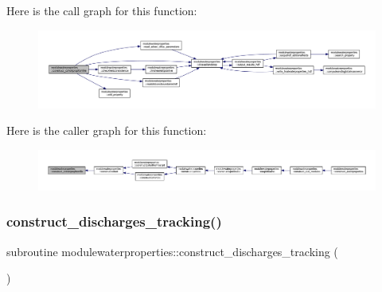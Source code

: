 Here is the call graph for this function\+:\nopagebreak
\begin{figure}[H]
\begin{center}
\leavevmode
\includegraphics[width=350pt]{namespacemodulewaterproperties_ad9060a1bd0766835e26c1961f52d84a0_cgraph}
\end{center}
\end{figure}
Here is the caller graph for this function\+:\nopagebreak
\begin{figure}[H]
\begin{center}
\leavevmode
\includegraphics[width=350pt]{namespacemodulewaterproperties_ad9060a1bd0766835e26c1961f52d84a0_icgraph}
\end{center}
\end{figure}
\mbox{\label{namespacemodulewaterproperties_a30c3709afcaafdcec85f3efda5a73d03}} 
\subsubsection{\texorpdfstring{construct\+\_\+discharges\+\_\+tracking()}{construct\_discharges\_tracking()}}
{\footnotesize\ttfamily subroutine modulewaterproperties\+::construct\+\_\+discharges\+\_\+tracking (\begin{DoxyParamCaption}{ }\end{DoxyParamCaption})\hspace{0.3cm}{\ttfamily [private]}}

